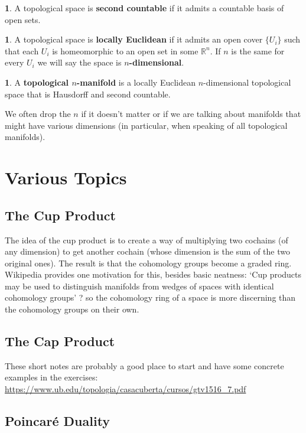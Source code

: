 \documentclass[oneside,english]{amsbook}
\numberwithin{section}{chapter}
\theoremstyle{plain}
\theoremstyle{definition}
\newtheorem{defn}[thm]{\protect\definitionname}
\providecommand{\definitionname}{Definition}
\begin{document}
		\begin{defn} 
			A topological space is \textbf{second countable} if it admits a countable basis of open sets.
		\end{defn}

		\begin{defn} 
			A topological space is \textbf{locally Euclidean} if it admits an open cover $\{U_i\}$ such that each $U_i$ is homeomorphic to an open set in some $\mathbb{R}^n$. If $n$ is the same for every $U_i$ we will say the space is \textbf{$n$-dimensional}.
		\end{defn}

		\begin{defn} 
			A \textbf{topological $n$-manifold} is a locally Euclidean $n$-dimensional topological space that is Hausdorff and second countable.  
		\end{defn}
		
		We often drop the $n$ if it doesn't matter or if we are talking about manifolds that might have various dimensions (in particular, when speaking of all topological manifolds).
	
	
	\chapter{Various Topics}
	\section{The Cup Product}
	
	The idea of the cup product is to create a way of multiplying two cochains (of any dimension) to get another cochain (whose dimension is the sum of the two original ones). The result is that the cohomology groups become a graded ring. Wikipedia provides one motivation for this, besides basic neatness: `Cup products may be used to distinguish manifolds from wedges of spaces with identical cohomology groups' ? so the cohomology ring of a space is more discerning than the cohomology groups on their own. 
	
	\section{The Cap Product}
	
	These short notes are probably a good place to start and have some concrete examples in the exercises: \url{https://www.ub.edu/topologia/casacuberta/cursos/gtv1516_7.pdf}
	
	\section{Poincar\'e Duality}
	
\end{document}
